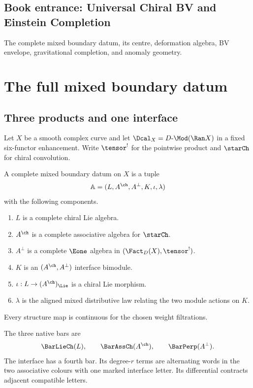 \cleardoublepage
{}
{}
\chapter*{Book entrance: Universal Chiral BV and Einstein Completion}
\begin{summarybox}
The complete mixed boundary datum, its centre, deformation algebra, BV envelope, gravitational completion, and anomaly geometry.
\end{summarybox}
\part{The full mixed boundary datum}

\chapter{Three products and one interface}
Let $X$ be a smooth complex curve and let $\Dcal_X=D\text{-}\Mod(\Ran X)$ in a fixed six-functor enhancement.  Write $\tensor^!$ for the pointwise product and $\starCh$ for chiral convolution.

\begin{definition}
A complete mixed boundary datum on $X$ is a tuple
\[
 \mathbb A=(L,A^{\ch},A^\perp,K,\iota,\lambda)
\]
with the following components.
\begin{enumerate}
\item $L$ is a complete chiral Lie algebra.
\item $A^{\ch}$ is a complete associative algebra for $\starCh$.
\item $A^\perp$ is a complete $\Eone$ algebra in $(\Fact_D(X),\tensor^!)$.
\item $K$ is an $(A^{\ch},A^\perp)$ interface bimodule.
\item $\iota:L\to(A^{\ch})_{\Lie}$ is a chiral Lie morphism.
\item $\lambda$ is the aligned mixed distributive law relating the two module actions on $K$.
\end{enumerate}
Every structure map is continuous for the chosen weight filtrations.
\end{definition}

The three native bars are
\[
 \BarLieCh(L),\qquad
 \BarAssCh(A^{\ch}),\qquad
 \BarPerp(A^\perp).
\]
The interface has a fourth bar.  Its degree-$r$ terms are alternating words in the two associative colours with one marked interface letter.  Its differential contracts adjacent compatible letters.

